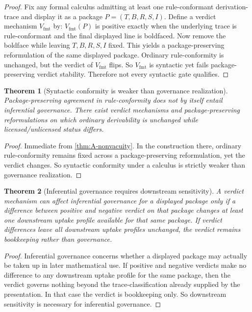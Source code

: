 \documentclass[11pt]{article}
\theoremstyle{plain}
\newtheorem{theorem}{Theorem}[section]
\theoremstyle{definition}
\begin{document}
\begin{proof}
Fix any formal calculus admitting at least one rule-conformant derivation-trace and display it as a package $P=(T,B,R,S,I)$. Define a verdict mechanism $V_{\mathrm{fmt}}$ by: $V_{\mathrm{fmt}}(P)$ is positive exactly when the underlying trace is rule-conformant and the final displayed line is boldfaced. Now remove the boldface while leaving $T,B,R,S,I$ fixed. This yields a package-preserving reformulation of the same displayed package. Ordinary rule-conformity is unchanged, but the verdict of $V_{\mathrm{fmt}}$ flips. So $V_{\mathrm{fmt}}$ is syntactic yet fails package-preserving verdict stability. Therefore not every syntactic gate qualifies.
\end{proof}

\begin{theorem}[Syntactic conformity is weaker than governance realization]
\label{thm:A-syntax-weaker}
Package-preserving agreement in rule-conformity does not by itself entail inferential governance. There exist verdict mechanisms and package-preserving reformulations on which ordinary derivability is unchanged while licensed/unlicensed status differs.
\end{theorem}

\begin{proof}
Immediate from \cref{thm:A-nonvacuity}. In the construction there, ordinary rule-conformity remains fixed across a package-preserving reformulation, yet the verdict changes. So syntactic conformity under a calculus is strictly weaker than governance realization.
\end{proof}

\begin{theorem}[Inferential governance requires downstream sensitivity]
\label{thm:A-trajectory-sensitive}
A verdict mechanism can affect inferential governance for a displayed package only if a difference between positive and negative verdict on that package changes at least one downstream uptake profile available for that same package. If verdict differences leave all downstream uptake profiles unchanged, the verdict remains bookkeeping rather than governance.
\end{theorem}

\begin{proof}
Inferential governance concerns whether a displayed package may actually be taken up in later mathematical use. If positive and negative verdicts make no difference to any downstream uptake profile for the same package, then the verdict governs nothing beyond the trace-classification already supplied by the presentation. In that case the verdict is bookkeeping only. So downstream sensitivity is necessary for inferential governance.
\end{proof}
\end{document}
